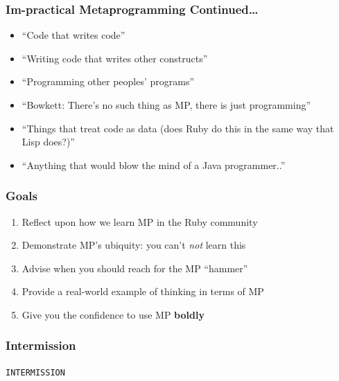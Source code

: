 \documentclass[slidestop,compress,mathserif]{beamer}
\begin{document}
\begin{frame}
	\frametitle{\textbf{Im}-practical Metaprogramming Continued{\ldots}}
	\begin{itemize}
		\item ``Code that writes code''
		\pause
		\item ``Writing code that writes other constructs''
		\pause
		\item ``Programming other peoples' programs''
		\pause
		\item ``Bowkett:  There's no such thing as MP, there is just programming''
		\pause
		\item ``Things that treat code as data (does Ruby do this in the same way that Lisp does?)''
		\item ``Anything that would blow the mind of a Java programmer..''
	\end{itemize}
\end{frame}

\begin{frame}
	\frametitle{Goals}
	\begin{enumerate}
		\item Reflect upon how we learn MP in the Ruby community
		\pause
		\item Demonstrate MP's ubiquity:  you can't \emph{not} learn this
		\pause
		\item Advise when you should reach for the MP ``hammer''
		\pause
		\item Provide a real-world example of thinking in terms of MP
		\pause
		\item Give you the confidence to use MP \textbf{boldly}
	\end{enumerate}
\end{frame}

\begin{frame}
	\frametitle{Intermission}
	\begin{center}
		\texttt{INTERMISSION}
	\end{center}
\end{frame}
\end{document}
